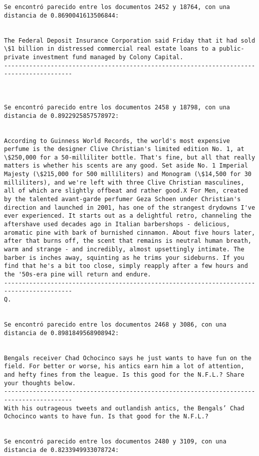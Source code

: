 \documentclass[11pt]{article}
\begin{document}
\begin{Verbatim}[commandchars=\\\{\}]
Se encontró parecido entre los documentos 2452 y 18764, con una distancia de 0.8690041613506844:


The Federal Deposit Insurance Corporation said Friday that it had sold \$1 billion in distressed commercial real estate loans to a public-private investment fund managed by Colony Capital.
-----------------------------------------------------------------------------------------



Se encontró parecido entre los documentos 2458 y 18798, con una distancia de 0.8922925857578972:


According to Guinness World Records, the world's most expensive perfume is the designer Clive Christian's limited edition No. 1, at \$250,000 for a 50-milliliter bottle. That's fine, but all that really matters is whether his scents are any good. Set aside No. 1 Imperial Majesty (\$215,000 for 500 milliliters) and Monogram (\$14,500 for 30 milliliters), and we're left with three Clive Christian masculines, all of which are slightly offbeat and rather good.X For Men, created by the talented avant-garde perfumer Geza Schoen under Christian's direction and launched in 2001, has one of the strangest drydowns I've ever experienced. It starts out as a delightful retro, channeling the aftershave used decades ago in Italian barbershops - delicious, aromatic pine with bark of burnished cinnamon. About five hours later, after that burns off, the scent that remains is neutral human breath, warm and strange - and incredibly, almost upsettingly intimate. The barber is inches away, squinting as he trims your sideburns. If you find that he's a bit too close, simply reapply after a few hours and the '50s-era pine will return and endure.
-----------------------------------------------------------------------------------------
Q.


Se encontró parecido entre los documentos 2468 y 3086, con una distancia de 0.8981849568908942:


Bengals receiver Chad Ochocinco says he just wants to have fun on the field. For better or worse, his antics earn him a lot of attention, and hefty fines from the league. Is this good for the N.F.L.? Share your thoughts below.
-----------------------------------------------------------------------------------------
With his outrageous tweets and outlandish antics, the Bengals’ Chad Ochocinco wants to have fun. Is that good for the N.F.L.?


Se encontró parecido entre los documentos 2480 y 3109, con una distancia de 0.8233949933078724:



\end{Verbatim}
\end{document}

